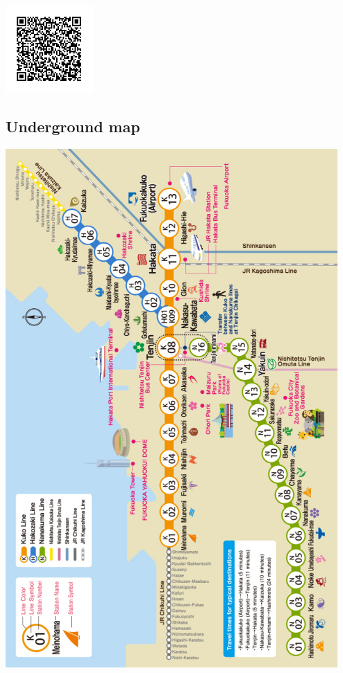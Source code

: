\includegraphics[width=0.25\textwidth]{tour_meeting_place_qrcode.png}

\subsection*{Underground map}

\noindent\includegraphics[width=0.95\textwidth]{underground_map.png}
